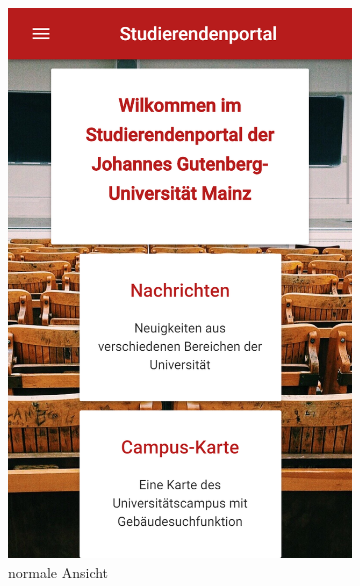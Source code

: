 \begin{figure}
\begin{subfigure}{.5\textwidth}
  \centering
  \includegraphics[width=.8\linewidth]{gfx/Layout(1)}
  \caption{normale Ansicht}
  \label{fig:layout1}
\end{subfigure}%
\begin{subfigure}{.5\textwidth}
  \centering

\end{subfigure}
\end{figure}
